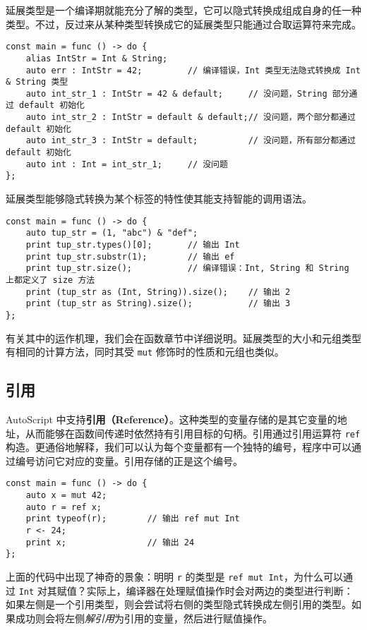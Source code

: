 延展类型是一个编译期就能充分了解的类型，它可以隐式转换成组成自身的任一种类型。不过，反过来从某种类型转换成它的延展类型只能通过合取运算符来完成。

\begin{lstlisting}
const main = func () -> do {
    alias IntStr = Int & String;
    auto err : IntStr = 42;         // 编译错误，Int 类型无法隐式转换成 Int & String 类型
    auto int_str_1 : IntStr = 42 & default;     // 没问题，String 部分通过 default 初始化
    auto int_str_2 : IntStr = default & default;// 没问题，两个部分都通过 default 初始化
    auto int_str_3 : IntStr = default;          // 没问题，所有部分都通过 default 初始化
    auto int : Int = int_str_1;     // 没问题
};
\end{lstlisting}

延展类型能够隐式转换为某个标签的特性使其能支持智能的调用语法。

\begin{lstlisting}
const main = func () -> do {
    auto tup_str = (1, "abc") & "def";
    print tup_str.types()[0];       // 输出 Int
    print tup_str.substr(1);        // 输出 ef
    print tup_str.size();           // 编译错误：Int, String 和 String 上都定义了 size 方法
    print (tup_str as (Int, String)).size();    // 输出 2
    print (tup_str as String).size();           // 输出 3
};
\end{lstlisting}

有关其中的运作机理，我们会在函数章节中详细说明。延展类型的大小和元组类型有相同的计算方法，同时其受 \lstinline!mut! 修饰时的性质和元组也类似。


\subsection{引用}

AutoScript 中支持\textbf{引用（Reference）}。这种类型的变量存储的是其它变量的地址，从而能够在函数间传递时依然持有引用目标的句柄。引用通过引用运算符 \lstinline!ref! 构造。更通俗地解释，我们可以认为每个变量都有一个独特的编号，程序中可以通过编号访问它对应的变量。引用存储的正是这个编号。

\begin{lstlisting}
const main = func () -> do {
    auto x = mut 42;
    auto r = ref x;
    print typeof(r);        // 输出 ref mut Int
    r <- 24;
    print x;                // 输出 24
};
\end{lstlisting}

上面的代码中出现了神奇的景象：明明 \lstinline!r! 的类型是 \lstinline!ref mut Int!，为什么可以通过 \lstinline!Int! 对其赋值？实际上，编译器在处理赋值操作时会对两边的类型进行判断：如果左侧是一个引用类型，则会尝试将右侧的类型隐式转换成左侧引用的类型。如果成功则会将左侧\emph{解引用}为引用的变量，然后进行赋值操作。 \\

